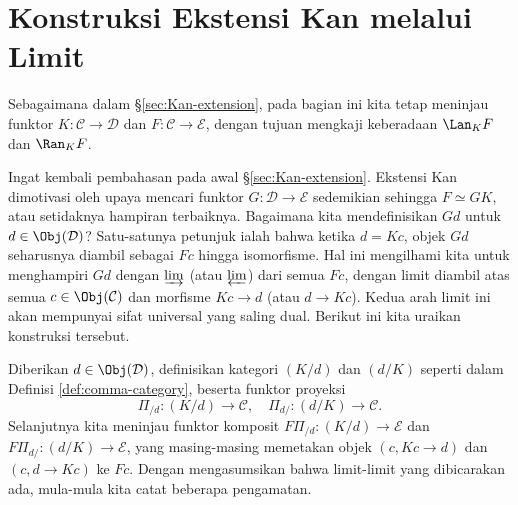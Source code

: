 
\section{Konstruksi Ekstensi Kan melalui Limit}\label{sec:Kan-as-limit}
\hypertarget{o014.aljabr2.chapter1.kan-extensions-as-limits}{ }

Sebagaimana dalam \S\ref{sec:Kan-extension}, pada bagian ini kita tetap
meninjau funktor $K: \mathcal{C} \to \mathcal{D}$ dan
$F: \mathcal{C} \to \mathcal{E}$, dengan tujuan mengkaji keberadaan
$\Lan_K F$ dan $\Ran_K F$.

Ingat kembali pembahasan pada awal \S\ref{sec:Kan-extension}. Ekstensi Kan
dimotivasi oleh upaya mencari funktor $G: \mathcal{D} \to \mathcal{E}$
sedemikian sehingga $F \simeq GK$, atau setidaknya hampiran terbaiknya.
Bagaimana kita mendefinisikan $Gd$ untuk $d \in \Obj(\mathcal{D})$?
Satu-satunya petunjuk ialah bahwa ketika $d = Kc$, objek $Gd$ seharusnya
diambil sebagai $Fc$ hingga isomorfisme. Hal ini mengilhami kita untuk
menghampiri $Gd$ dengan $\varinjlim$ (atau $\varprojlim$) dari semua $Fc$,
dengan limit diambil atas semua $c \in \Obj(\mathcal{C})$ dan morfisme
$Kc \to d$ (atau $d \to Kc$). Kedua arah limit ini akan mempunyai sifat
universal yang saling dual. Berikut ini kita uraikan konstruksi tersebut.

Diberikan $d \in \Obj(\mathcal{D})$, definisikan kategori $(K/d)$ dan $(d/K)$
seperti dalam Definisi \ref{def:comma-category}, beserta funktor proyeksi
\[ \Pi_{/d}: (K/d) \to \mathcal{C}, \quad \Pi_{d/}: (d/K) \to \mathcal{C}. \]
Selanjutnya kita meninjau funktor komposit
$F \Pi_{/d}: (K/d) \to \mathcal{E}$ dan
$F \Pi_{d/}: (d/K) \to \mathcal{E}$, yang masing-masing memetakan objek
$(c, Kc \to d)$ dan $(c, d \to Kc)$ ke $Fc$. Dengan mengasumsikan bahwa
limit-limit yang dibicarakan ada, mula-mula kita catat beberapa pengamatan.

